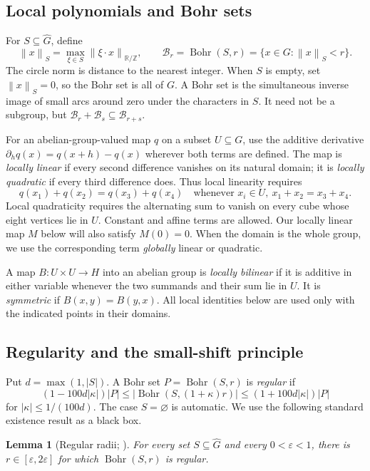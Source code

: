 \documentclass[11pt,a4paper]{article}
\newcommand{\T}{\mathbb R/\mathbb Z}
\newcommand{\Gh}{\widehat G}
\newcommand{\Bohr}{\operatorname{Bohr}}
\newcommand{\bb}{\mathcal B}
\newcommand{\norm}[1]{\left\|#1\right\|}
\newcommand{\GT}[1]{\cite[#1]{GT}}
\newtheorem{lemma}{Lemma}[section]
\theoremstyle{definition}
\numberwithin{equation}{section}
\begin{document}
\subsection{Local polynomials and Bohr sets}
For $S\subseteq\Gh$, define
\[
\norm{x}_S=\max_{\xi\in S}\norm{\xi\cdot x}_{\T},\qquad
\bb_r=\Bohr(S,r)=\{x\in G:\norm{x}_S<r\}.
\]
The circle norm is distance to the nearest integer. When $S$ is empty,
set $\norm{x}_S=0$, so the Bohr set is all of $G$.
A Bohr set is the simultaneous inverse image of small arcs around zero
under the characters in $S$. It need not be a subgroup, but
$\bb_r+\bb_s\subseteq\bb_{r+s}$.

For an abelian-group-valued map $q$ on a subset $U\subseteq G$, use the
additive derivative $\partial_hq(x)=q(x+h)-q(x)$ wherever both terms
are defined. The map is \emph{locally linear} if every second difference
vanishes on its natural domain; it is \emph{locally quadratic} if every
third difference does. Thus local linearity requires
\[
q(x_1)+q(x_2)=q(x_3)+q(x_4)
\quad\text{whenever }x_i\in U,\ x_1+x_2=x_3+x_4.
\]
Local quadraticity requires the alternating sum to vanish on every cube
whose eight vertices lie in $U$. Constant and affine terms are allowed.
Our locally linear map $M$ below will also satisfy $M(0)=0$.
When the domain is the whole group, we use the corresponding term
\emph{globally} linear or quadratic.

A map $B:U\times U\to H$ into an abelian group is \emph{locally
bilinear} if it is additive in either variable whenever the two summands
and their sum lie in $U$. It is \emph{symmetric} if $B(x,y)=B(y,x)$.
All local identities below are used only with the indicated points in
their domains.

\subsection{Regularity and the small-shift principle}
Put $d=\max(1,|S|)$. A Bohr set $P=\Bohr(S,r)$ is \emph{regular} if
\begin{equation}\label{eq:regularity}
(1-100d|\kappa|)|P|\leq|\Bohr(S,(1+\kappa)r)|
\leq(1+100d|\kappa|)|P|
\end{equation}
for $|\kappa|\leq1/(100d)$. The case $S=\varnothing$ is automatic.
We use the following standard existence result as a black box.

\begin{lemma}[Regular radii; {\GT{Lemma 8.2}}]
For every set $S\subseteq\Gh$ and every $0<\varepsilon<1$, there is
$r\in[\varepsilon,2\varepsilon]$ for which $\Bohr(S,r)$ is regular.
\end{lemma}
\end{document}
